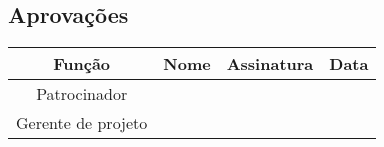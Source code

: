 \begin{landscape}
\section{Aprovações}

\begin{table}[H]
	\begin{tabularx}{\textwidth}{| c | c | X | c |}
		\hline
		\textbf{Função}  & \textbf{Nome}         & \textbf{Assinatura}        & \textbf{Data} \\
		\hline
		Patrocinador       & \projectSponsorName{} & \projectSponsorSignature{} &               \\
		\hline
		Gerente de projeto & \projectManagerName{} & \projectManagerSignature{} &               \\
		\hline
	\end{tabularx}
	\centering
\end{table}

\end{landscape}